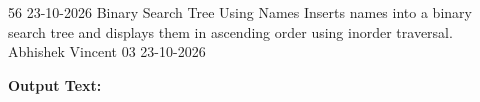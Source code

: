 \clearpage
\label{prog:56}
\programhead
  {56}
  {23-10-2026}
  {Binary Search Tree Using Names}
  {Inserts names into a binary search tree and displays them in ascending order using inorder traversal.}
  {Abhishek Vincent}
  {03}
  {23-10-2026}

\divider
\textbf{Output Text:}\par
\vspace{2pt}

